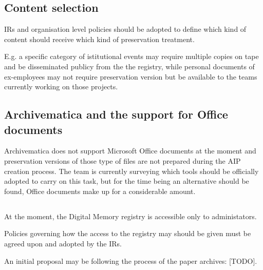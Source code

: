 \documentclass[11pt]{IEEEtran}
\begin{document}
\subsection{Content selection}

IRs and organisation level policies should be adopted to define which kind of content should receive which kind of preservation treatment.

E.g. a specific category of istitutional events may require multiple copies on tape and be disseminated publicy from the the registry, while personal documents of ex-employees may not require preservation version but be available to the teams currently working on those projects.


\subsection{Archivematica and the support for Office documents}
Archivematica does not support Microsoft Office documents at the moment and preservation versions of those type of files are not prepared during the AIP creation process.
The team is currently surveying which tools should be officially adopted to carry on this task, but for the time being an alternative should be found, Office documents make up for a considerable amount.

\subsection{}
At the moment, the Digital Memory registry is accessible only to administators.

Policies governing how the access to the registry may should be given must be agreed upon and adopted by the IRs.

An initial proposal may be following the process of the paper archives: [TODO].



\end{document}
